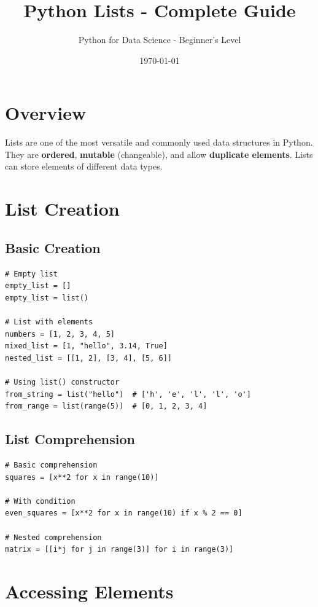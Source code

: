 \documentclass[12pt,a4paper]{article}
\title{\textbf{Python Lists - Complete Guide}}
\author{Python for Data Science - Beginner's Level}
\date{\today}
\begin{document}
\maketitle
\tableofcontents
\newpage

\section{Overview}

Lists are one of the most versatile and commonly used data structures in Python. They are \textbf{ordered}, \textbf{mutable} (changeable), and allow \textbf{duplicate elements}. Lists can store elements of different data types.

\section{List Creation}

\subsection{Basic Creation}

\begin{lstlisting}
# Empty list
empty_list = []
empty_list = list()

# List with elements
numbers = [1, 2, 3, 4, 5]
mixed_list = [1, "hello", 3.14, True]
nested_list = [[1, 2], [3, 4], [5, 6]]

# Using list() constructor
from_string = list("hello")  # ['h', 'e', 'l', 'l', 'o']
from_range = list(range(5))  # [0, 1, 2, 3, 4]
\end{lstlisting}

\subsection{List Comprehension}

\begin{lstlisting}
# Basic comprehension
squares = [x**2 for x in range(10)]

# With condition
even_squares = [x**2 for x in range(10) if x % 2 == 0]

# Nested comprehension
matrix = [[i*j for j in range(3)] for i in range(3)]
\end{lstlisting}

\section{Accessing Elements}
\end{document}
